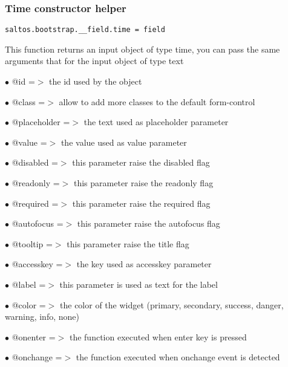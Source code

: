 \documentclass[a4paper]{article}
\begin{document}
\hypertarget{toc614}{}
\subsubsection{Time constructor helper}

\begin{lstlisting}
saltos.bootstrap.__field.time = field
\end{lstlisting}

This function returns an input object of type time, you can pass the same arguments
that for the input object of type text

\begin{compactitem}
\item[\color{myblue}$\bullet$] @id          =$>$ the id used by the object
\item[\color{myblue}$\bullet$] @class       =$>$ allow to add more classes to the default form-control
\item[\color{myblue}$\bullet$] @placeholder =$>$ the text used as placeholder parameter
\item[\color{myblue}$\bullet$] @value       =$>$ the value used as value parameter
\item[\color{myblue}$\bullet$] @disabled    =$>$ this parameter raise the disabled flag
\item[\color{myblue}$\bullet$] @readonly    =$>$ this parameter raise the readonly flag
\item[\color{myblue}$\bullet$] @required    =$>$ this parameter raise the required flag
\item[\color{myblue}$\bullet$] @autofocus   =$>$ this parameter raise the autofocus flag
\item[\color{myblue}$\bullet$] @tooltip     =$>$ this parameter raise the title flag
\item[\color{myblue}$\bullet$] @accesskey   =$>$ the key used as accesskey parameter
\item[\color{myblue}$\bullet$] @label       =$>$ this parameter is used as text for the label
\item[\color{myblue}$\bullet$] @color       =$>$ the color of the widget (primary, secondary, success, danger, warning, info, none)
\item[\color{myblue}$\bullet$] @onenter     =$>$ the function executed when enter key is pressed
\item[\color{myblue}$\bullet$] @onchange    =$>$ the function executed when onchange event is detected
\end{compactitem}
\end{document}
